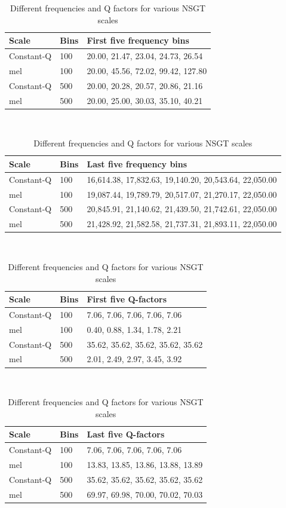 \documentclass[report.tex]{subfiles}
\begin{document}
\begin{table}[ht]
	\centering
	\caption{Different frequencies and Q factors for various NSGT scales}
	\label{table:nsgtfreqsandqs}
\begin{tabular}{ |l|l|p{10cm}| }
	 \hline
	 Scale & Bins & First five frequency bins \\
	 \hline
	 \hline
	 Constant-Q & 100 & 20.00, 21.47, 23.04, 24.73, 26.54 \\
	 \hline
	 mel & 100 & 20.00, 45.56, 72.02, 99.42, 127.80 \\
	 \hline
	 Constant-Q & 500 & 20.00, 20.28, 20.57, 20.86, 21.16 \\
	 \hline
	 mel & 500 & 20.00, 25.00, 30.03, 35.10, 40.21 \\
	 \hline
\end{tabular}\\
\vspace{1em}
\begin{tabular}{ |l|l|p{10cm}| }
	 \hline
	 Scale & Bins & Last five frequency bins \\
	 \hline
	 \hline
	 Constant-Q & 100 & 16,614.38, 17,832.63, 19,140.20, 20,543.64, 22,050.00 \\
	 \hline
	 mel & 100 & 19,087.44, 19,789.79, 20,517.07, 21,270.17, 22,050.00 \\
	 \hline
	 Constant-Q & 500 & 20,845.91, 21,140.62, 21,439.50, 21,742.61, 22,050.00 \\
	 \hline
	 mel & 500 & 21,428.92, 21,582.58, 21,737.31, 21,893.11, 22,050.00 \\
	 \hline
\end{tabular}\\
\vspace{1em}
\begin{tabular}{ |l|l|p{10cm}| }
	 \hline
	 Scale & Bins & First five Q-factors \\
	 \hline
	 \hline
	 Constant-Q & 100 & 7.06, 7.06, 7.06, 7.06, 7.06  \\
	 \hline
	 mel & 100 & 0.40, 0.88, 1.34, 1.78, 2.21 \\
	 \hline
	 Constant-Q & 500 & 35.62, 35.62, 35.62, 35.62, 35.62 \\
	 \hline
	 mel & 500 & 2.01, 2.49, 2.97, 3.45, 3.92 \\
	 \hline
\end{tabular}\\
\vspace{1em}
\begin{tabular}{ |l|l|p{10cm}| }
	 \hline
	 Scale & Bins & Last five Q-factors \\
	 \hline
	 \hline
	 Constant-Q & 100 & 7.06, 7.06, 7.06, 7.06, 7.06  \\
	 \hline
	 mel & 100 & 13.83, 13.85, 13.86, 13.88, 13.89 \\
	 \hline
	 Constant-Q & 500 & 35.62, 35.62, 35.62, 35.62, 35.62 \\
	 \hline
	 mel & 500 & 69.97, 69.98, 70.00, 70.02, 70.03 \\
	 \hline
\end{tabular}
\end{table}
\end{document}
